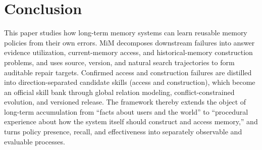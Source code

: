 \documentclass[11pt]{article}
\begin{document}
\section{Conclusion}
\label{sec:conclusion}

This paper studies how long-term memory systems can learn reusable memory
policies from their own errors. MiM decomposes downstream failures into answer
evidence utilization, current-memory access, and historical-memory construction
problems, and uses source, version, and natural search trajectories to form
auditable repair targets. Confirmed access and construction failures are
distilled into direction-separated candidate skills (access and construction),
which become an official skill bank through global relation modeling,
conflict-constrained evolution, and versioned release. The framework thereby extends the object of long-term
accumulation from ``facts about users and the world'' to ``procedural experience
about how the system itself should construct and access memory,'' and turns
policy presence, recall, and effectiveness into separately observable and
evaluable processes.
\end{document}
